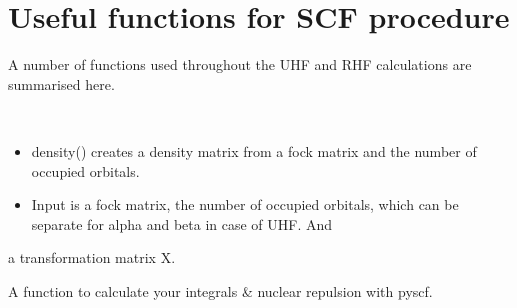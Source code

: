 \documentclass[letterpaper,10pt,english]{sphinxmanual}
\begin{document}
\label{\detokenize{SCF_functions:module-ghf.SCF_functions}}

\chapter{Useful functions for SCF procedure}
\label{\detokenize{SCF_functions:useful-functions-for-scf-procedure}}\label{\detokenize{SCF_functions::doc}}
A number of functions used throughout the UHF and RHF calculations are summarised here.

\begin{fulllineitems}
\label{\detokenize{SCF_functions:ghf.SCF_functions.density_matrix}}~\begin{itemize}
\item {} 
density() creates a density matrix from a fock matrix and the number of occupied orbitals.

\item {} 
Input is a fock matrix, the number of occupied orbitals, which can be separate for alpha and beta in case of UHF. And

\end{itemize}

a transformation matrix X.

\end{fulllineitems}


\begin{fulllineitems}
\label{\detokenize{SCF_functions:ghf.SCF_functions.get_integrals}}
A function to calculate your integrals \& nuclear repulsion with pyscf.

\end{fulllineitems}

\end{document}
